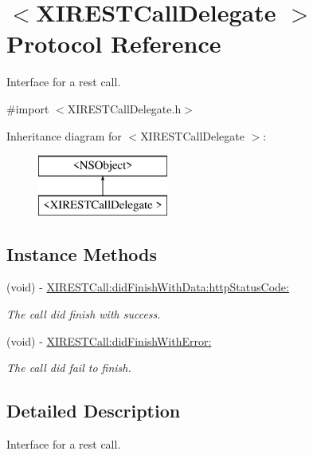 \hypertarget{protocol_x_i_r_e_s_t_call_delegate_01-p}{}\section{$<$X\+I\+R\+E\+S\+T\+Call\+Delegate $>$ Protocol Reference}
\label{protocol_x_i_r_e_s_t_call_delegate_01-p}


Interface for a rest call.  




{\ttfamily \#import $<$X\+I\+R\+E\+S\+T\+Call\+Delegate.\+h$>$}

Inheritance diagram for $<$X\+I\+R\+E\+S\+T\+Call\+Delegate $>$\+:\begin{figure}[H]
\begin{center}
\leavevmode
\includegraphics[height=2.000000cm]{protocol_x_i_r_e_s_t_call_delegate_01-p}
\end{center}
\end{figure}
\subsection*{Instance Methods}
\begin{DoxyCompactItemize}
\item 
(void) -\/ \hyperlink{protocol_x_i_r_e_s_t_call_delegate_01-p_ab47c12249ea52d9a38894ff453321a73}{X\+I\+R\+E\+S\+T\+Call\+:did\+Finish\+With\+Data\+:http\+Status\+Code\+:}
\begin{DoxyCompactList}\small\item\em The call did finish with success. \end{DoxyCompactList}\item 
(void) -\/ \hyperlink{protocol_x_i_r_e_s_t_call_delegate_01-p_ab95cc81b044092d6dc1216f923aa5b50}{X\+I\+R\+E\+S\+T\+Call\+:did\+Finish\+With\+Error\+:}
\begin{DoxyCompactList}\small\item\em The call did fail to finish. \end{DoxyCompactList}\end{DoxyCompactItemize}


\subsection{Detailed Description}
Interface for a rest call. 

